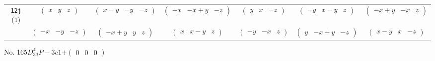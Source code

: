 \documentclass[fleqn,9pt,landscape]{jsarticle}
\begin{document}
\begin{center}
\begin{longtable}{ccccccc}
{\tt 12j} ({\tt 1}) & $ \begin{pmatrix} x & y & z \end{pmatrix} $ & $ \begin{pmatrix} x - y & - y & - z \end{pmatrix} $ & $ \begin{pmatrix} - x & - x + y & - z \end{pmatrix} $ & $ \begin{pmatrix} y & x & - z \end{pmatrix} $ & $ \begin{pmatrix} - y & x - y & z \end{pmatrix} $ & $ \begin{pmatrix} - x + y & - x & z \end{pmatrix} $ \\
& $ \begin{pmatrix} - x & - y & - z \end{pmatrix} $ & $ \begin{pmatrix} - x + y & y & z \end{pmatrix} $ & $ \begin{pmatrix} x & x - y & z \end{pmatrix} $ & $ \begin{pmatrix} - y & - x & z \end{pmatrix} $ & $ \begin{pmatrix} y & - x + y & - z \end{pmatrix} $ & $ \begin{pmatrix} x - y & x & - z \end{pmatrix} $ \\
\end{longtable}
\end{center}
\newpage
No. 165\quad$D_{3d}^{4}$\quad$P-3c1$\quad[ trigonal ]\quad$+\begin{pmatrix} 0 & 0 & 0 \end{pmatrix}$
\end{document}
